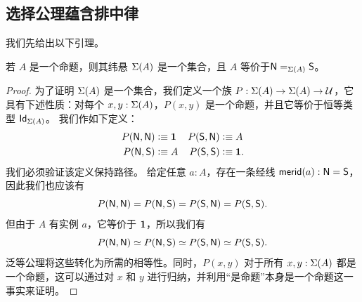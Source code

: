 %

\subsection{选择公理蕴含排中律}
\label{subsec:emacinsets}


我们先给出以下引理。

\begin{lem}\label{prop:trunc_of_prop_is_set}
若 $A$ 是一个命题，则其纬悬 $\susp(A)$ 是一个集合，且 $A$ 等价于$\id[\susp(A)]{\north}{\south}$。
\end{lem}

\begin{proof}
为了证明 $\susp(A)$ 是一个集合，我们定义一个族 $P:\susp(A)\to\susp(A)\to\type$，它具有下述性质：对每个 $x,y:\susp(A)$，$P(x,y)$ 是一个命题，并且它等价于恒等类型 $\idtypevar{\susp(A)}$。
%
我们作如下定义：
\begin{align*}
P(\north,\north) & \defeq \unit &
P(\south,\north) & \defeq A\\
P(\north,\south) & \defeq A &
P(\south,\south) & \defeq \unit.
\end{align*}
我们必须验证该定义保持路径。
给定任意 $a : A$，存在一条经线 $\merid(a) : \north = \south$，因此我们也应该有
%
\begin{equation*}
  P(\north, \north) = P(\north, \south) = P(\south, \north) = P(\south, \south).
\end{equation*}
%
但由于 $A$ 有实例 $a$，它等价于 $\unit$，所以我们有
%
\begin{equation*}
  P(\north, \north) \eqvsym P(\north, \south) \eqvsym P(\south, \north) \eqvsym P(\south, \south).
\end{equation*}
%
泛等公理将这些转化为所需的相等性。同时，$P(x,y)$ 对于所有 $x, y : \susp(A)$ 都是一个命题，这可以通过对 $x$ 和 $y$ 进行归纳，并利用``是命题''本身是一个命题这一事实来证明。


\end{proof}
